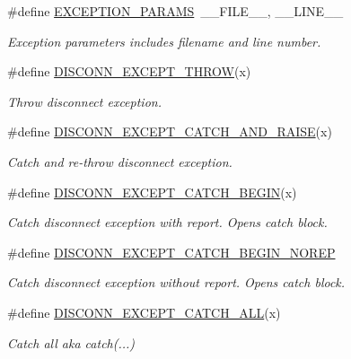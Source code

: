 \begin{DoxyCompactItemize}
\item 
\#define \hyperlink{group__EXCEPT__GROUP_gad17cc7779410e71d94722126b762a3f3}{E\+X\+C\+E\+P\+T\+I\+O\+N\+\_\+\+P\+A\+R\+A\+MS}~\+\_\+\+\_\+\+F\+I\+L\+E\+\_\+\+\_\+, \+\_\+\+\_\+\+L\+I\+N\+E\+\_\+\+\_\+
\begin{DoxyCompactList}\small\item\em Exception parameters includes filename and line number. \end{DoxyCompactList}\item 
\#define \hyperlink{group__EXCEPT__GROUP_ga9271529edaf4938342fe2c16ea4539a2}{D\+I\+S\+C\+O\+N\+N\+\_\+\+E\+X\+C\+E\+P\+T\+\_\+\+T\+H\+R\+OW}(x)
\begin{DoxyCompactList}\small\item\em Throw disconnect exception. \end{DoxyCompactList}\item 
\#define \hyperlink{group__EXCEPT__GROUP_gaf912806beff3d8ce88b3a42ad6b40550}{D\+I\+S\+C\+O\+N\+N\+\_\+\+E\+X\+C\+E\+P\+T\+\_\+\+C\+A\+T\+C\+H\+\_\+\+A\+N\+D\+\_\+\+R\+A\+I\+SE}(x)
\begin{DoxyCompactList}\small\item\em Catch and re-\/throw disconnect exception. \end{DoxyCompactList}\item 
\#define \hyperlink{group__EXCEPT__GROUP_ga20a7d853d1b1747473acd142d59243d2}{D\+I\+S\+C\+O\+N\+N\+\_\+\+E\+X\+C\+E\+P\+T\+\_\+\+C\+A\+T\+C\+H\+\_\+\+B\+E\+G\+IN}(x)
\begin{DoxyCompactList}\small\item\em Catch disconnect exception with report. Opens catch block. \end{DoxyCompactList}\item 
\#define \hyperlink{group__EXCEPT__GROUP_ga1319e3cfc7ea4e32ae6ec2b2932df669}{D\+I\+S\+C\+O\+N\+N\+\_\+\+E\+X\+C\+E\+P\+T\+\_\+\+C\+A\+T\+C\+H\+\_\+\+B\+E\+G\+I\+N\+\_\+\+N\+O\+R\+EP}
\begin{DoxyCompactList}\small\item\em Catch disconnect exception without report. Opens catch block. \end{DoxyCompactList}\item 
\#define \hyperlink{group__EXCEPT__GROUP_ga68eddf699cb35b0ba76d737545b24167}{D\+I\+S\+C\+O\+N\+N\+\_\+\+E\+X\+C\+E\+P\+T\+\_\+\+C\+A\+T\+C\+H\+\_\+\+A\+LL}(x)
\begin{DoxyCompactList}\small\item\em Catch all aka catch(...) \end{DoxyCompactList}\item 

\end{DoxyCompactItemize}
